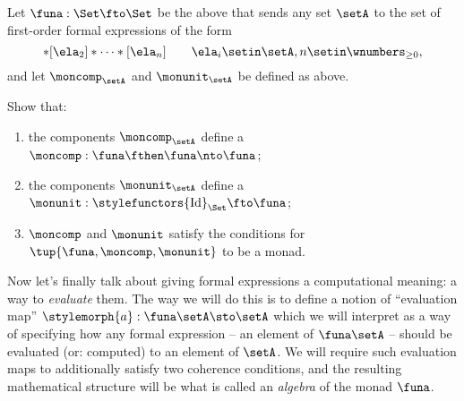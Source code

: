 \begin{gradedexercise}
    \label{ex:ListMonad}
    Let $\funa : \Set \fto \Set$ be the  above that sends any set $\setA$ to the set of first-order formal expressions of the form
    \begin{equation}
        [\ela_1]
        * [\ela_2] * \cdots * [\ela_n] \quad \quad \ela_i \setin \setA, n \setin \wnumbers_{\geq 0},
    \end{equation}
    and let $\moncomp_\setA$ and $\monunit_\setA$ be defined as above.

    Show that:
    \begin{enumerate}
        \item the components $\moncomp_\setA$ define a  $\moncomp : \funa \fthen \funa \nto \funa$;
        \item the components $\monunit_\setA$ define a  $\monunit : \stylefunctors{\text{Id}}_{\Set} \fto \funa$;
        \item $\moncomp$ and $\monunit$ satisfy the conditions for $\tup{\funa, \moncomp, \monunit}$ to be a monad.
    \end{enumerate}
\end{gradedexercise}


Now let's finally talk about giving formal expressions a computational meaning: a way to \emph{evaluate} them.
The way we will do this is to define a notion of ``evaluation map'' $\stylemorph{a}: \funa \setA \sto \setA$ which we will interpret as a way of specifying how any formal expression -- an element of $\funa \setA$ -- should be evaluated (or: computed) to an element of $\setA$.
We will require such evaluation maps to additionally satisfy two coherence conditions, and the resulting mathematical structure will be what is called an \emph{algebra} of the monad $\funa$.


